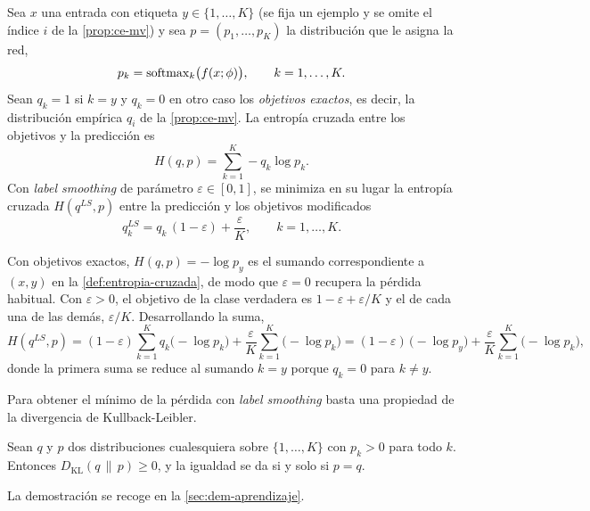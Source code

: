 \begin{definicion}\label{def:label-smoothing}
Sea $x$ una entrada con etiqueta $y\in\{1,\dots,K\}$ (se fija un ejemplo y se omite el
índice $i$ de la \cref{prop:ce-mv}) y sea $p = (p_1,\dots,p_K)$ la
distribución que le asigna la red,
\[
  p_k = \operatorname{softmax}_k\bigl(f(x;\phi)\bigr), \qquad k = 1,\dots,K.
\]
Sean
$q_k = 1$ si $k = y$ y $q_k = 0$ en otro caso los \emph{objetivos exactos}, es decir,
la distribución empírica $q_i$ de la \cref{prop:ce-mv}. La
entropía cruzada entre los objetivos y la predicción es
\[
  H(q, p) = \sum_{k=1}^{K} -q_k \log p_k .
\]
Con \emph{label smoothing} de parámetro $\varepsilon\in[0,1]$, se minimiza en su
lugar la entropía cruzada $H(q^{LS}, p)$ entre la predicción y los objetivos
modificados
\[
  q^{LS}_k = q_k\,(1-\varepsilon) + \frac{\varepsilon}{K}, \qquad k = 1,\dots,K.
\]
\end{definicion}

Con objetivos exactos, $H(q,p) = -\log p_y$ es el sumando correspondiente a
$(x, y)$ en la \cref{def:entropia-cruzada}, de modo que $\varepsilon = 0$ recupera
la pérdida habitual. Con $\varepsilon > 0$, el objetivo de la clase verdadera es
$1 - \varepsilon + \varepsilon/K$ y el de cada una de las demás, $\varepsilon/K$.
Desarrollando la suma,
\[
  H(q^{LS}, p) = (1-\varepsilon)\sum_{k=1}^{K} q_k\bigl(-\log p_k\bigr)
               + \frac{\varepsilon}{K}\sum_{k=1}^{K} \bigl(-\log p_k\bigr)
             = (1-\varepsilon)\,\bigl(-\log p_y\bigr)
               + \frac{\varepsilon}{K}\sum_{k=1}^{K} \bigl(-\log p_k\bigr),
\]
donde la primera suma se reduce al sumando $k=y$ porque $q_k=0$ para $k\ne y$.

Para obtener el mínimo de la pérdida con \emph{label smoothing} basta una
propiedad de la divergencia de Kullback-Leibler.

\begin{lema}\label{lem:kl-no-negativa}
Sean $q$ y $p$ dos distribuciones cualesquiera sobre $\{1,\dots,K\}$ con $p_k > 0$ para todo
$k$. Entonces $D_{\mathrm{KL}}(q\,\|\,p) \ge 0$, y la igualdad se da si y solo si
$p = q$.
\end{lema}
La demostración se recoge en la \cref{sec:dem-aprendizaje}.

